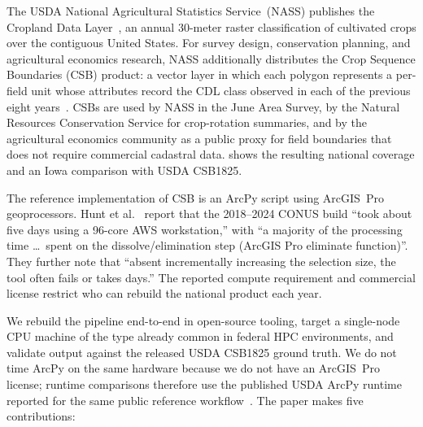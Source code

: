 \documentclass[preprint,12pt]{elsarticle}
\begin{document}
The USDA National Agricultural Statistics Service~(NASS) publishes the
Cropland Data Layer~\cite{boryan2011cdl}, an annual 30-meter raster
classification of cultivated crops over the contiguous United States.
For survey design, conservation planning, and agricultural economics
research, NASS additionally distributes the Crop Sequence Boundaries
(CSB) product: a vector layer in which each polygon represents a
per-field unit whose attributes record the CDL class observed in each
of the previous eight years~\cite{hunt2024csb,hunt2024iaos}. CSBs are
used by NASS in the June Area Survey, by the Natural Resources
Conservation Service for crop-rotation summaries, and by the
agricultural economics community as a public proxy for field
boundaries that does not require commercial cadastral data.
 shows the resulting national coverage and an Iowa comparison
with USDA CSB1825.

The reference implementation of CSB is an ArcPy script using ArcGIS~Pro
geoprocessors. Hunt et al.~\cite{hunt2024csb} report that the 2018--2024 CONUS
build ``took about five days using a 96-core AWS workstation,'' with
``a majority of the processing time \dots\ spent on the
dissolve/elimination step (ArcGIS Pro eliminate function)''. They
further note that ``absent incrementally increasing the selection size,
the tool often fails or takes days.'' The reported compute requirement and
commercial license restrict who can rebuild the national product each year.

We rebuild the pipeline end-to-end in open-source tooling, target a
single-node CPU machine of the type already common in federal HPC
environments, and validate output against the released USDA CSB1825
ground truth. We do not time ArcPy on the same hardware because we do
not have an ArcGIS~Pro license; runtime comparisons therefore use the
published USDA ArcPy runtime reported for the same public reference
workflow~\cite{hunt2024csb,usda_csb_repo}.
The paper makes five contributions:
\end{document}
